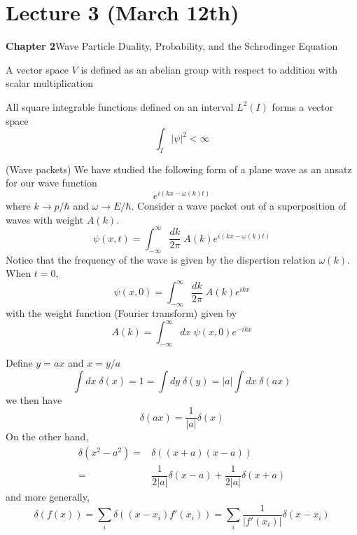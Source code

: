 \section{Lecture 3 (March 12th)}
{\bf Chapter 2}\hspace{2ex}Wave Particle Duality, Probability, and the Schrodinger Equation
\\
\begin{defi}
A vector space $V$ is defined as an abelian group with respect to addition with scalar multiplication 
\end{defi}
\vspace{2ex}
\begin{ex}
All square integrable functions defined on an interval $L^2(I)$ forms a vector space
\[\int _{I}|\psi  |^2<\infty \]
\end{ex}
\vspace{2ex}
\begin{thm}
(Wave packets) We have studied the following form of a plane wave as an ansatz for our wave function 
\[e^{i({ k} { x}-\omega ({ k})t)}\]
where ${ k}\rightarrow { p}/\hbar $ and $\omega \rightarrow E/\hbar $. Consider a wave packet out of a superposition of waves with weight $A({k})$.
\[\psi  ({ x},t)=\int_{-\infty }^{\infty } \dfrac{dk}{2\pi }\;{A({ k})}e^{i({ k} {x}-\omega ({ k})t)}\]
Notice that the frequency of the wave is given by the dispertion relation $\omega ({ k})$. When $t=0$,
\[\psi ({ x},0)=\int_{-\infty }^{\infty } \dfrac{d{k}}{2\pi }\;A(k)e^{i{ k}{ x}}\]
with the weight function (Fourier transform) given by
\[A({ k})=\int_{-\infty }^{\infty } d{ x}\;\psi (x,0)e^{-i{ k} {x}}\]
\end{thm}
\vspace{2ex}
\begin{thm}
Define $y=ax$ and $x=y/a$
\[\int  dx\;\delta (x)=1=\int dy\;\delta (y)=|a|\int dx\;\delta (ax)\]
we then have
\[\delta (ax)=\dfrac{1}{|a|}\delta (x)\]
On the other hand,
\begin{align*}
\delta (x^2-a^2)=&\delta ((x+a)(x-a))\\
=&\dfrac{1}{2|a|}\delta (x-a)+\dfrac{1}{2|a|}\delta (x+a)
\end{align*}
and more generally, 
\[\delta (f(x))=\sum_{i}\delta ((x-x_{i})f'(x_{i}))=\sum _{i}\dfrac{1}{|f'(x_{i})|}\delta (x-x_{i})\]
\end{thm}
\vspace{2ex}

